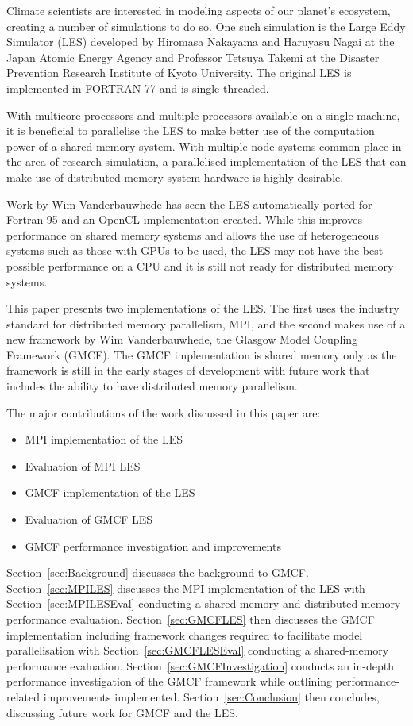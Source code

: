 Climate scientists are interested in modeling aspects of our planet's ecosystem,
creating a number of simulations to do so. One such simulation is the Large Eddy
Simulator (LES) developed by Hiromasa Nakayama and Haruyasu Nagai at the Japan
Atomic Energy Agency and Professor Tetsuya Takemi at the Disaster Prevention
Research Institute of Kyoto University. The original LES is implemented in
FORTRAN 77 and is single threaded.

With multicore processors and multiple processors available on a single machine,
it is beneficial to parallelise the LES to make better use of the computation
power of a shared memory system. With multiple node systems common place in the
area of research simulation, a parallelised implementation of the LES that can
make use of distributed memory system hardware is highly desirable.

Work by Wim Vanderbauwhede has seen the LES automatically ported for Fortran 95
and an OpenCL implementation created. While this improves performance on shared
memory systems and allows the use of heterogeneous systems such as those with
GPUs to be used, the LES may not have the best possible performance on a CPU and
it is still not ready for distributed memory systems.

This paper presents two implementations of the LES. The first uses the industry
standard for distributed memory parallelism, MPI, and the second makes use of a
new framework by Wim Vanderbauwhede, the Glasgow Model Coupling Framework
(GMCF). The GMCF implementation is shared memory only as the framework is still
in the early stages of development with future work that includes the ability to
have distributed memory parallelism.

The major contributions of the work discussed in this paper are:

\begin{itemize}
    \item MPI implementation of the LES
    \item Evaluation of MPI LES
    \item GMCF implementation of the LES
    \item Evaluation of GMCF LES
    \item GMCF performance investigation and improvements
\end{itemize}

Section~\ref{sec:Background} discusses the background to GMCF.
Section~\ref{sec:MPILES} discusses the MPI implementation of the LES with
Section~\ref{sec:MPILESEval} conducting a shared-memory and distributed-memory
performance evaluation. Section~\ref{sec:GMCFLES} then discusses the GMCF
implementation including framework changes required to facilitate model
parallelisation with Section~\ref{sec:GMCFLESEval} conducting a shared-memory
performance evaluation. Section~\ref{sec:GMCFInvestigation} conducts an in-depth
performance investigation of the GMCF framework while outlining
performance-related improvements implemented. Section~\ref{sec:Conclusion} then
concludes, discussing future work for GMCF and the LES.
